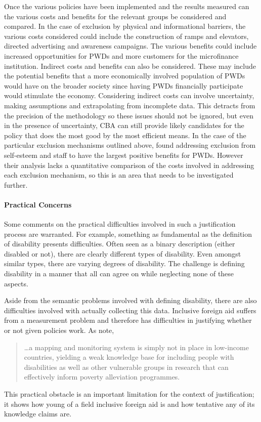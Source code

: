 \documentclass[a4paper]{article}
\begin{document}
Once the various policies have been implemented and the results measured can
the various costs and benefits for the relevant groups be considered and
compared. In the case of exclusion by physical and informational barriers, the
various costs considered could include the construction of ramps and
elevators, directed advertising and awareness campaigns. The various benefits
could include increased opportunities for PWDs and more customers for the
microfinance institution. Indirect costs and benefits can also be considered.
These may include the potential benefits that a more economically involved
population of PWDs would have on the broader society since having PWDs
financially participate would stimulate the economy. Considering indirect
costs can involve uncertainty, making assumptions and extrapolating from
incomplete data. This detracts from the precision of the methodology so these
issues should not be ignored, but even in the presence of uncertainty, CBA can
still provide likely candidates for the policy that does the most good by the
most efficient means. In the case of the particular exclusion mechanisms
outlined above, \cite{mersland2008access} found addressing exclusion from
self-esteem and staff to have the largest positive benefits for PWDs. However
their analysis lacks a quantitative comparison of the costs involved in
addressing each exclusion mechanism, so this is an area that needs to be
investigated further.

\paragraph{Practical Concerns}

Some comments on the practical difficulties involved in such a justification
process are warranted. For example, something as fundamental as the definition
of disability presents difficulties. Often seen as a binary description
(either disabled or not), there are clearly different types of disability.
Even amongst similar types, there are varying degrees of disability. The
challenge is defining disability in a manner that all can agree on while
neglecting none of these aspects.

Aside from the semantic problems involved with defining disability, there are
also difficulties involved with actually collecting this data. Inclusive
foreign aid suffers from a measurement problem and therefore has difficulties
in justifying whether or not given policies work. As
\cite{ingstad2011disability} note,
%
\begin{quote}
    \ldots a mapping and monitoring system is simply not in place in
    low-income countries, yielding a weak knowledge base for including people
    with disabilities as well as other vulnerable groups in research that can
    effectively inform poverty alleviation programmes.
\end{quote}
%
This practical obstacle is an important limitation for the context of
justification; it shows how young of a field inclusive foreign aid is and how
tentative any of its knowledge claims are.
\end{document}
